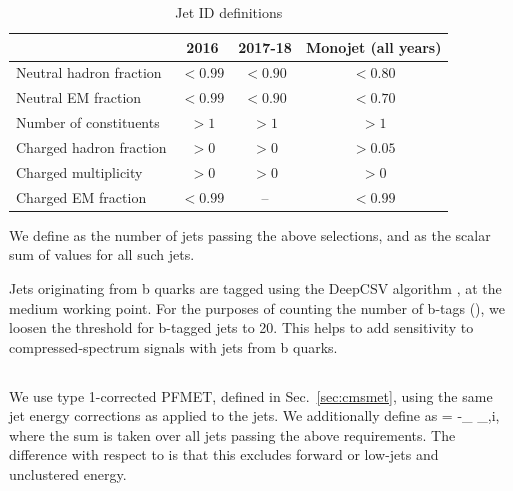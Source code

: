 \begin{table}[h]
\caption{Jet ID definitions}
\label{tab:jet_id}
\centering
\begin{tabular}{l|c|c|c}
\hline
 & 2016 & 2017-18 & Monojet (all years) \\ \hline
Neutral hadron fraction & $<0.99$ & $<0.90$ & $<0.80$ \\
Neutral EM fraction & $<0.99$ & $<0.90$ & $<0.70$ \\
Number of constituents & $>1$ & $>1$ & $>1$ \\
Charged hadron fraction & $>0$ & $>0$ & $>0.05$ \\
Charged multiplicity & $>0$ & $>0$ & $>0$ \\
Charged EM fraction & $<0.99$ & -- & $<0.99$ \\
\hline
\end{tabular}
\end{table}

We define \Nj as the number of jets passing the above selections, and \Ht as 
the scalar sum of \pt values for all such jets.

Jets originating from b quarks are tagged using the DeepCSV algorithm \cite{BTV_btagging}, at the medium working point. 
For the purposes of counting the number of b-tags (\Nb), we loosen the \pt threshold for b-tagged jets to 20\GeV.
This helps to add sensitivity to compressed-spectrum signals with jets from b quarks.

\subsection{\ptmiss}
We use type 1-corrected PFMET, defined in Sec.~\ref{sec:cmsmet}, using the same jet energy corrections
as applied to the jets. We additionally define \vMht as
\be
\vMht = -\sum_ _{,i},
\ee
where the sum is taken over all jets passing the above requirements. The difference with respect to \vMet is that
this excludes forward or low-\pt jets and unclustered energy.

